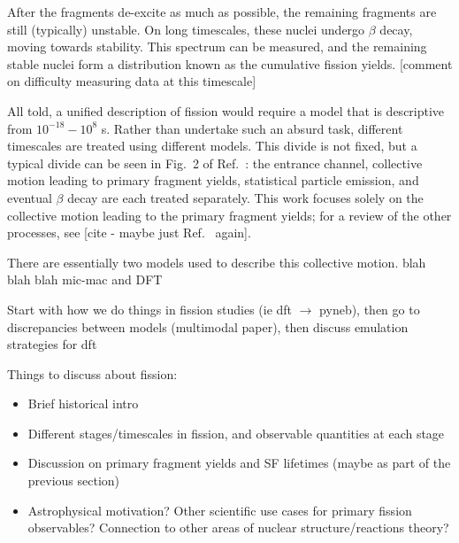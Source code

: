 \documentclass[../thesis.tex]{subfiles}
\begin{document}
After the fragments de-excite as much as possible, the remaining fragments are still (typically) unstable. On long timescales, these nuclei undergo $\beta$ decay, moving towards stability. This spectrum can be measured, and the remaining stable nuclei form a distribution known as the cumulative fission yields. [comment on difficulty measuring data at this timescale]

All told, a unified description of fission would require a model that is descriptive from $10^{-18}-10^8$ s. Rather than undertake such an absurd task, different timescales are treated using different models. This divide is not fixed, but a typical divide can be seen in Fig.~2 of Ref.~\cite{Bender2020}: the entrance channel, collective motion leading to primary fragment yields, statistical particle emission, and eventual $\beta$ decay are each treated separately. This work focuses solely on the collective motion leading to the primary fragment yields; for a review of the other processes, see [cite - maybe just Ref.~\cite{Bender2020} again].

There are essentially two models used to describe this collective motion. blah blah blah mic-mac and DFT

\newpage
Start with how we do things in fission studies (ie dft $\to$ pyneb), then go to discrepancies between models (multimodal paper), then discuss emulation strategies for dft

Things to discuss about fission:
\begin{itemize}
	\item Brief historical intro
	\item Different stages/timescales in fission, and observable quantities at each stage
	\item Discussion on primary fragment yields and SF lifetimes (maybe as part of the previous section)
	\item Astrophysical motivation? Other scientific use cases for primary fission observables? Connection to other areas of nuclear structure/reactions theory?
\end{itemize}
\end{document}
